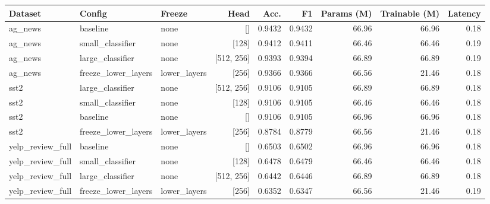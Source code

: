 \begin{tabular}{lllrrrrrr}
\toprule
Dataset & Config & Freeze & Head & Acc. & F1 & Params (M) & Trainable (M) & Latency \\
\midrule
ag\_news & baseline & none & [] & 0.9432 & 0.9432 & 66.96 & 66.96 & 0.18 \\
ag\_news & small\_classifier & none & [128] & 0.9412 & 0.9411 & 66.46 & 66.46 & 0.19 \\
ag\_news & large\_classifier & none & [512, 256] & 0.9393 & 0.9394 & 66.89 & 66.89 & 0.19 \\
ag\_news & freeze\_lower\_layers & lower\_layers & [256] & 0.9366 & 0.9366 & 66.56 & 21.46 & 0.18 \\
sst2 & large\_classifier & none & [512, 256] & 0.9106 & 0.9105 & 66.89 & 66.89 & 0.18 \\
sst2 & small\_classifier & none & [128] & 0.9106 & 0.9105 & 66.46 & 66.46 & 0.18 \\
sst2 & baseline & none & [] & 0.9106 & 0.9105 & 66.96 & 66.96 & 0.18 \\
sst2 & freeze\_lower\_layers & lower\_layers & [256] & 0.8784 & 0.8779 & 66.56 & 21.46 & 0.18 \\
yelp\_review\_full & baseline & none & [] & 0.6503 & 0.6502 & 66.96 & 66.96 & 0.18 \\
yelp\_review\_full & small\_classifier & none & [128] & 0.6478 & 0.6479 & 66.46 & 66.46 & 0.18 \\
yelp\_review\_full & large\_classifier & none & [512, 256] & 0.6442 & 0.6446 & 66.89 & 66.89 & 0.18 \\
yelp\_review\_full & freeze\_lower\_layers & lower\_layers & [256] & 0.6352 & 0.6347 & 66.56 & 21.46 & 0.19 \\
\bottomrule
\end{tabular}
